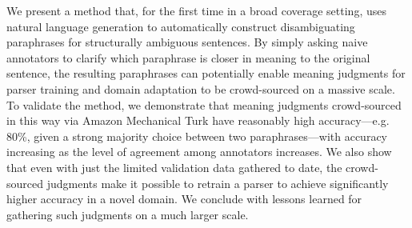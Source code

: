 We present a method that, for the first time in a broad coverage setting, uses natural language generation to automatically construct disambiguating paraphrases for structurally ambiguous sentences.  By simply asking naive annotators to clarify which paraphrase is closer in meaning to the original sentence, the resulting paraphrases can potentially enable meaning judgments for parser training and domain adaptation to be crowd-sourced on a massive scale.  To validate the method, we demonstrate that meaning judgments crowd-sourced in this way via Amazon Mechanical Turk have reasonably high accuracy---e.g. 80\%, given a strong majority choice between two paraphrases---with accuracy increasing as the level of agreement among annotators increases.  We also show that even with just the limited validation data gathered to date, the crowd-sourced judgments make it possible to retrain a parser to achieve significantly higher accuracy in a novel domain.  We conclude with lessons learned for gathering such judgments on a much larger scale.
